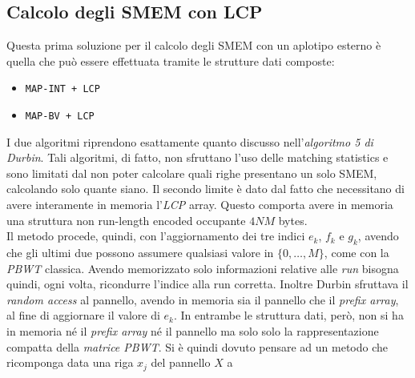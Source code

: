 \subsection{Calcolo degli SMEM con LCP}
Questa prima soluzione per il calcolo degli SMEM con un aplotipo esterno è
quella che può essere effettuata tramite le strutture dati composte:
\begin{itemize}
  \item \texttt{MAP-INT + LCP}
  \item \texttt{MAP-BV + LCP}
\end{itemize}
I due algoritmi riprendono esattamente quanto discusso nell'\textit{algoritmo 5
  di Durbin}. Tali algoritmi, di 
fatto, non sfruttano l'uso delle matching statistics e sono limitati dal non
poter calcolare quali righe presentano un solo SMEM, calcolando solo quante
siano. Il secondo limite è dato dal fatto che necessitano di avere interamente
in memoria l'\textit{LCP} array. Questo comporta avere in memoria una
struttura non run-length encoded occupante $4NM$ bytes.\\
Il metodo procede, quindi, con l'aggiornamento dei tre indici $e_k$, $f_k$ e
$g_k$, avendo che gli ultimi due possono assumere qualsiasi valore in
$\{0,\ldots, M\}$,
come con la \textit{PBWT} classica. Avendo memorizzato solo informazioni
relative alle \textit{run} bisogna quindi, ogni volta, ricondurre l'indice alla
run corretta.
Inoltre Durbin sfruttava il \textit{random access} al pannello, avendo in
memoria sia il pannello che il \textit{prefix array}, al fine di aggiornare il
valore di $e_k$. In entrambe le struttura dati, però,
non si ha in memoria né il \textit{prefix array} né il pannello ma solo solo la
rappresentazione compatta della \textit{matrice PBWT}. Si è quindi dovuto
pensare ad un metodo che ricomponga data una riga $x_j$ del pannello $X$ a
